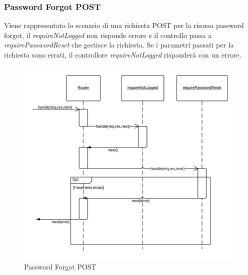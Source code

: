 \subsubsection{Password Forgot POST} 
Viene rappresentato lo scenario di una richiesta POST per la risorsa password forgot, il \emph{requireNotLogged} non risponde errore e il controllo passa a \emph{requirePasswordReset} che gestisce la richiesta.
Se i parametri passati per la richiesta sono errati, il controllore \emph{requireNotLogged} risponderà con un errore.
\begin{figure}[H]
	\begin{center} 
		\includegraphics[scale=0.20]{scenari/Password Forgot POST.png} 
		\caption{Password Forgot POST}
	\end{center} 
\end{figure}

